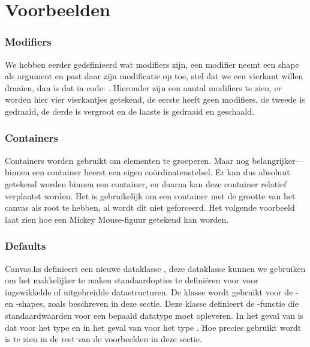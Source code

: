 \section{Voorbeelden}
\subsubsection{Modifiers}
We hebben eerder gedefinieerd wat modifiers zijn, een modifier neemt een shape als argument en past daar zijn modificatie op toe, stel dat we een vierkant willen draaien, dan is dat in code: \mbox{.} Hieronder zijn een aantal modifiers te zien, er worden hier vier vierkantjes getekend, de eerste heeft geen modifiers, de tweede is gedraaid, de derde is vergroot en de laaste is gedraaid en geschaald.



\subsubsection{Containers}
Containers worden gebruikt om elementen te groeperen. Maar nog belangrijker—binnen een container heerst een eigen coördinatenstelsel. Er kan dus absoluut getekend worden binnen een container, en daarna kan deze container relatief verplaatst worden. Het is gebruikelijk om een container met de grootte van het canvas als root te hebben, al wordt dit niet geforceerd. Het volgende voorbeeld laat zien hoe een Mickey Mouse-figuur getekend kan worden.



\subsubsection{Defaults} \label{subsubsec:handleiding_defaults}
Canvas.hs definieert een nieuwe dataklasse , deze dataklasse kunnen we gebruiken om het makkelijker te maken standaardopties te definiëren voor voor ingewikkelde of uitgebreidde datastructuren. De klasse wordt gebruikt voor de - en -shapes, zoals beschreven in deze sectie. Deze klasse definieert de -functie die standaardwaarden voor een bepaald datatype moet opleveren. In het geval van  is dat voor het type  en in het geval van  voor het type . Hoe  precies gebruikt wordt is te zien in de rest van de voorbeelden in deze sectie.

